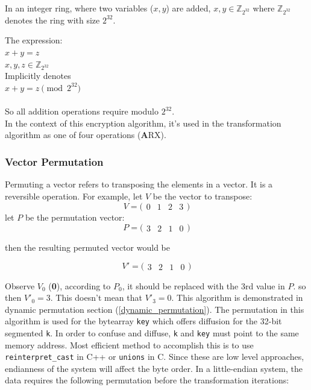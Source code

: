 \documentclass[11pt]{article}
\theoremstyle{definition}
\theoremstyle{remark}
\begin{document}
In an integer ring, where two variables ($x,y$) are added, $x,y \in \mathbb{Z}_{2^{32}}$ where $\mathbb{Z}_{2^{32}}$ denotes the ring with size $2^{32}$.

The expression:\\
$x + y = z$\\
$x,y,z \in \mathbb{Z}_{2^{32}}$\\

Implicitly denotes \\
$x + y = z \pmod {2^{32}}$\\
\\
So all addition operations require modulo $2^{32}$.\\
In the context of this encryption algorithm, it's used in the transformation algorithm as one of four operations (\textbf{A}RX). 

\subsubsection{Vector Permutation}

Permuting a vector refers to transposing the elements in a vector. It is a reversible operation.
For example, let $V$ be the vector to transpose: \\
\[
V = 
\big(
\begin{matrix}
	0 & 1 & 2 & 3
\end{matrix}
\big)
\]
let $P$ be the permutation vector: \\

\[
P = 
\big(
\begin{matrix}
	3 & 2 & 1 & 0
\end{matrix}
\big)
\]

then the resulting permuted vector would be 

\[
V' = 
\big(
\begin{matrix}
	3 & 2 & 1 & 0
\end{matrix}
\big)
\]

Observe $V_0$ (\textbf{0}),  according to $P_0$, it should be replaced with the 3rd value in $P$. so then $V'_0 = 3$. This doesn't mean that $V'_3 = 0$. This algorithm is demonstrated in dynamic permutation section (\ref{dynamic_permutation}).
The permutation in this algorithm is used for the bytearray \texttt{key} which offers diffusion for the 32-bit segmented \texttt{k}. In order to confuse and diffuse, \texttt{k} and \texttt{key} must point to the same memory address. Most efficient method to accomplish this is to use \texttt{reinterpret\_cast} in C++ or \texttt{unions} in C. Since these are low level approaches, endianness of the system will affect the byte order. In a little-endian system, the data requires the following permutation before the transformation iterations:
\end{document}
